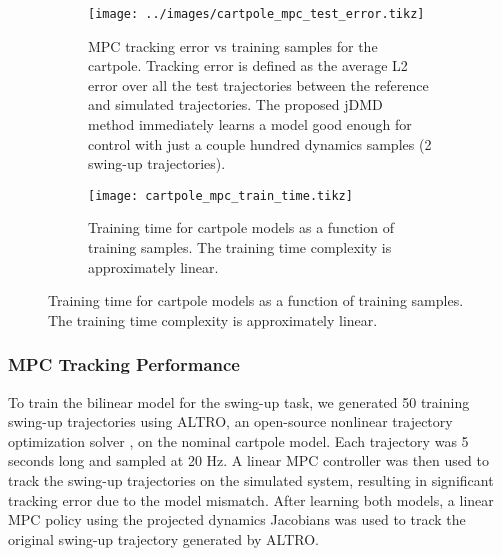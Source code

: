 \documentclass{article}
\begin{document}
\begin{figure}[t]
  \centering
  \begin{subfigure}[t]{0.48\textwidth}
    \raggedleft
    \texttt{[image: ../images/cartpole\_mpc\_test\_error.tikz]}
    \caption{MPC tracking error vs training samples for the cartpole. Tracking error is
    defined as the average L2 error over all the test trajectories between the reference and
    simulated trajectories. The proposed jDMD method immediately learns a model good enough
    for control with just a couple hundred dynamics samples (2 swing-up trajectories).}
    \label{fig:cartpole_mpc_test_error}
  \end{subfigure}
  \hfill
  \begin{subfigure}[t]{0.48\textwidth}
    \raggedright
    \texttt{[image: cartpole\_mpc\_train\_time.tikz]}
    \caption{Training time for cartpole models as a function of training samples. The 
    training time complexity is approximately linear.}
    \label{fig:cartpole_train_time}
  \end{subfigure}
\end{figure}

\subsubsection{MPC Tracking Performance}

To train the bilinear model for the swing-up task, we generated 50 training swing-up
trajectories using ALTRO, an open-source nonlinear trajectory optimization solver 
\cite{Howell2019,Jackson2021}, on the nominal cartpole model. Each trajectory was 5 seconds
long and sampled at 20 Hz.  A linear MPC controller was then used to track the swing-up
trajectories on the simulated system, resulting in significant tracking error due to the
model mismatch.  After learning both models, a linear MPC policy using the projected 
dynamics Jacobians was used to track the original swing-up trajectory generated by ALTRO. 
\end{document}
